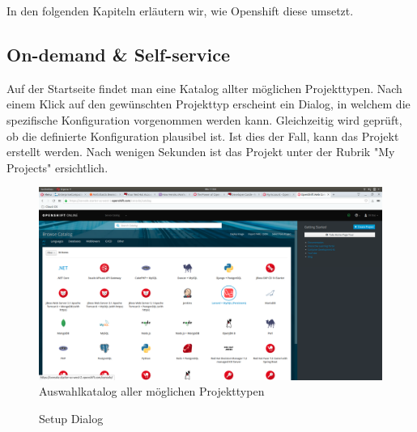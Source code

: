 \documentclass[12pt,a4paper]{article}
\begin{document}
In den folgenden Kapiteln erläutern wir, wie Openshift diese umsetzt.

\subsection{On-demand & Self-service}

Auf der Startseite findet man eine Katalog allter möglichen Projekttypen. Nach einem Klick auf den gewünschten Projekttyp erscheint ein Dialog, in welchem die spezifische Konfiguration vorgenommen werden kann. Gleichzeitig wird geprüft, ob die definierte Konfiguration plausibel ist. Ist dies der Fall, kann das Projekt erstellt werden.
Nach wenigen Sekunden ist das Projekt unter der Rubrik "My Projects" ersichtlich.

\begin{figure}[h]
	\centering
	\includegraphics[width=0.7\linewidth]{img/os-overview-catalog}
	\caption{Auswahlkatalog aller möglichen Projekttypen}
	\label{fig:os-catalog}
\end{figure}

\begin{figure}%
    \centering
    \qquad
    \caption{Setup Dialog}%
    \label{fig:os-setup}%
\end{figure}
\end{document}
